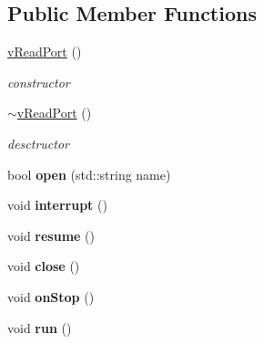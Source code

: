 \subsection*{Public Member Functions}
\begin{DoxyCompactItemize}
\item 
\mbox{\label{classev_1_1vReadPort_a8c559db85d642d2779d2ea02acf75bc9}} 
\hyperlink{classev_1_1vReadPort_a8c559db85d642d2779d2ea02acf75bc9}{v\+Read\+Port} ()
\begin{DoxyCompactList}\small\item\em constructor \end{DoxyCompactList}\item 
\mbox{\label{classev_1_1vReadPort_a7ce21badb00708a6914d8620bf17c797}} 
\hyperlink{classev_1_1vReadPort_a7ce21badb00708a6914d8620bf17c797}{$\sim$v\+Read\+Port} ()
\begin{DoxyCompactList}\small\item\em desctructor \end{DoxyCompactList}\item 
\mbox{\label{classev_1_1vReadPort_a73b4f47c06fac76af81d14a704b35fe4}} 
bool {\bfseries open} (std\+::string name)
\item 
\mbox{\label{classev_1_1vReadPort_a3458fb297eee91f29aa6d719876181b7}} 
void {\bfseries interrupt} ()
\item 
\mbox{\label{classev_1_1vReadPort_ab7356731a6a6818d52f77de0aff5e423}} 
void {\bfseries resume} ()
\item 
\mbox{\label{classev_1_1vReadPort_adcdefc13d430033e876351bd383866bc}} 
void {\bfseries close} ()
\item 
\mbox{\label{classev_1_1vReadPort_a1ff6550f46135f4d0a4e08436d90fa26}} 
void {\bfseries on\+Stop} ()
\item 
\mbox{\label{classev_1_1vReadPort_a383d2b1d3f896fce2fa352f76fe2fefb}} 
void {\bfseries run} ()
\item 
\mbox{\label{classev_1_1vReadPort_a8f35f4c4fecc0d416e69fc9ef43140c2}} 

\end{DoxyCompactItemize}
